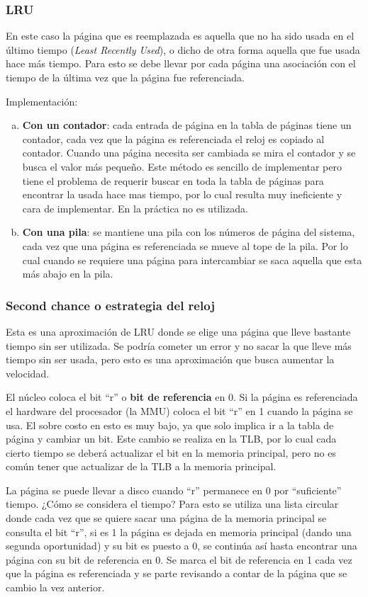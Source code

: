 \subsubsection{LRU}
En este caso la página que es reemplazada es aquella que no ha sido usada en el
último tiempo (\textit{Least Recently Used}), o dicho de otra forma aquella que
fue usada hace más tiempo. Para esto se debe llevar por cada página una
asociación con el tiempo de la última vez que la página fue referenciada.

Implementación:
\begin{enumerate}[a)]
	\item \textbf{Con un contador}: cada entrada de página en la tabla de
páginas tiene un contador, cada vez que la página es referenciada el reloj es
copiado al contador. Cuando una página necesita ser cambiada se mira el contador
y se busca el valor más pequeño. Este método es sencillo de implementar pero
tiene el problema de requerir buscar en toda la tabla de páginas para encontrar
la usada hace mas tiempo, por lo cual resulta muy ineficiente y cara de
implementar. En la práctica no es utilizada.
	\item \textbf{Con una pila}: se mantiene una pila con los números de
página del sistema, cada vez que una página es referenciada se mueve al tope de
la pila. Por lo cual cuando se requiere una página para intercambiar se saca
aquella que esta más abajo en la pila.
\end{enumerate}

\subsubsection{Second chance o estrategia del reloj}
Esta es una aproximación de LRU donde se elige una página que lleve bastante
tiempo sin ser utilizada. Se podría cometer un error y no sacar la que lleve más
tiempo sin ser usada, pero esto es una aproximación que busca aumentar la
velocidad.

El núcleo coloca el bit ``r'' o \textbf{bit de referencia} en 0. Si la página es
referenciada el hardware del procesador (la MMU) coloca el bit ``r'' en 1 cuando
la página se usa. El sobre costo en esto es muy bajo, ya que solo implica ir a
la tabla de página y cambiar un bit. Este cambio se realiza en la TLB, por lo
cual cada cierto tiempo se deberá actualizar el bit en la memoria principal,
pero no es común tener que actualizar de la TLB a la memoria principal.

La página se puede llevar a disco cuando ``r'' permanece en 0 por ``suficiente''
tiempo. ¿Cómo se considera el tiempo? Para esto se utiliza una lista circular
donde cada vez que se quiere sacar una página de la memoria principal se
consulta el bit ``r'', si es 1 la página es dejada en memoria principal (dando
una segunda oportunidad) y su bit es puesto a 0, se continúa así hasta encontrar
una página con su bit de referencia en 0. Se marca el bit de referencia en 1
cada vez que la página es referenciada y se parte revisando a contar de la
página que se cambio la vez anterior.

